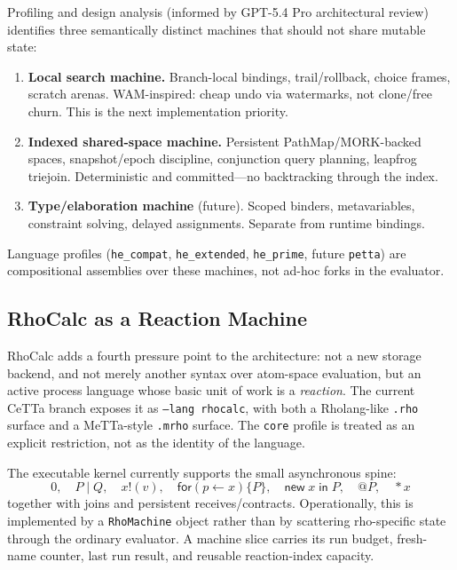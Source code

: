 \documentclass[11pt]{article}
\newcommand{\code}[1]{\texttt{#1}}
\newcommand{\CeTTa}{\textup{CeTTa}}
\newcommand{\RhoCalc}{\textup{RhoCalc}}
\begin{document}
Profiling and design analysis (informed by GPT-5.4 Pro architectural
review) identifies three semantically distinct machines that should
not share mutable state:

\begin{enumerate}
\item \textbf{Local search machine.}
  Branch-local bindings, trail/rollback, choice frames, scratch arenas.
  WAM-inspired: cheap undo via watermarks, not clone/free churn.
  This is the next implementation priority.

\item \textbf{Indexed shared-space machine.}
  Persistent PathMap/MORK-backed spaces, snapshot/epoch discipline,
  conjunction query planning, leapfrog triejoin.
  Deterministic and committed---no backtracking through the index.

\item \textbf{Type/elaboration machine} (future).
  Scoped binders, metavariables, constraint solving, delayed
  assignments.  Separate from runtime bindings.
\end{enumerate}

Language profiles (\code{he\_compat}, \code{he\_extended},
\code{he\_prime}, future \code{petta}) are compositional assemblies
over these machines, not ad-hoc forks in the evaluator.

\subsection{\RhoCalc{} as a Reaction Machine}

\RhoCalc{} adds a fourth pressure point to the architecture: not a new storage
backend, and not merely another syntax over atom-space evaluation, but an
active process language whose basic unit of work is a \emph{reaction}.  The
current \CeTTa{} branch exposes it as \code{--lang rhocalc}, with both a
Rholang-like \code{.rho} surface and a MeTTa-style \code{.mrho} surface.  The
\code{core} profile is treated as an explicit restriction, not as the identity
of the language.

The executable kernel currently supports the small asynchronous spine:
\[
  0,\quad P \mid Q,\quad x!(v),\quad
  \mathsf{for}(p \leftarrow x)\{P\},\quad
  \mathsf{new}\;x\;\mathsf{in}\;P,\quad
  @P,\quad *x
\]
together with joins and persistent receives/contracts.  Operationally, this is
implemented by a \code{RhoMachine} object rather than by scattering rho-specific
state through the ordinary evaluator.  A machine slice carries its run budget,
fresh-name counter, last run result, and reusable reaction-index capacity.
\end{document}
